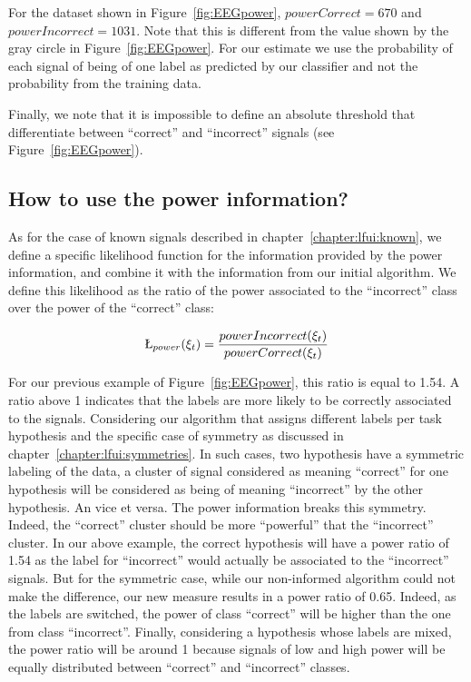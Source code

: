For the dataset shown in Figure~\ref{fig:EEGpower}, $powerCorrect = 670$ and $powerIncorrect = 1031$. Note that this is different from the value shown by the gray circle in Figure~\ref{fig:EEGpower}. For our estimate we use the probability of each signal of being of one label as predicted by our classifier and not the probability from the training data.

Finally, we note that it is impossible to define an absolute threshold that differentiate between ``correct'' and ``incorrect'' signals (see Figure~\ref{fig:EEGpower}). 

\subsection{How to use the power information?}

As for the case of known signals described in chapter~\ref{chapter:lfui:known}, we define a specific likelihood function for the information provided by the power information, and combine it with the information from our initial algorithm. We define this likelihood as the ratio of the power associated to the ``incorrect'' class over the power of the ``correct'' class:

\begin{eqnarray}
\L_{power}(\xi_t) = \frac{powerIncorrect(\xi_t)}{powerCorrect(\xi_t)}
\label{eq:power}
\end{eqnarray}

For our previous example of Figure~\ref{fig:EEGpower}, this ratio is equal to 1.54. A ratio above 1 indicates that the labels are more likely to be correctly associated to the signals. Considering our algorithm that assigns different labels per task hypothesis and the specific case of symmetry as discussed in chapter~\ref{chapter:lfui:symmetries}. In such cases, two hypothesis have a symmetric labeling of the data, a cluster of signal considered as meaning ``correct'' for one hypothesis will be considered as being of meaning ``incorrect'' by the other hypothesis. An vice et versa. The power information breaks this symmetry. Indeed, the ``correct'' cluster should be more ``powerful'' that the ``incorrect'' cluster. In our above example, the correct hypothesis will have a power ratio of 1.54 as the label for ``incorrect'' would actually be associated to the ``incorrect'' signals. But for the symmetric case, while our non-informed algorithm could not make the difference, our new measure results in a power ratio of 0.65. Indeed, as the labels are switched, the power of class ``correct'' will be higher than the one from class ``incorrect''. Finally, considering a hypothesis whose labels are mixed, the power ratio will be around 1 because signals of low and high power will be equally distributed between ``correct'' and ``incorrect'' classes. 

